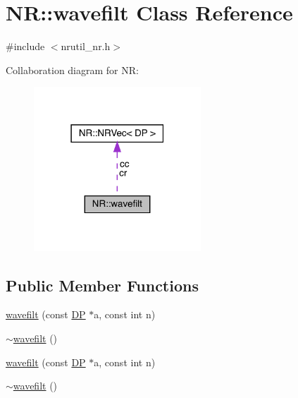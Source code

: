 \hypertarget{classNR_1_1wavefilt}{}\section{NR\+:\+:wavefilt Class Reference}
\label{classNR_1_1wavefilt}


{\ttfamily \#include $<$nrutil\+\_\+nr.\+h$>$}



Collaboration diagram for NR\+:\nopagebreak
\begin{figure}[H]
\begin{center}
\leavevmode
\includegraphics[width=178pt]{d6/d61/classNR_1_1wavefilt__coll__graph}
\end{center}
\end{figure}
\subsection*{Public Member Functions}
\begin{DoxyCompactItemize}
\item 
\mbox{\hyperlink{classNR_1_1wavefilt_aaa684e296af599915cdf4e0963b663c0}{wavefilt}} (const \mbox{\hyperlink{namespaceNR_af6ff762dd605ff477b8e52387253a02a}{DP}} $\ast$a, const int n)
\item 
\mbox{\hyperlink{classNR_1_1wavefilt_a9d223dd0fb637f3f511510b5efd9c6f6}{$\sim$wavefilt}} ()
\item 
\mbox{\hyperlink{classNR_1_1wavefilt_aaa684e296af599915cdf4e0963b663c0}{wavefilt}} (const \mbox{\hyperlink{namespaceNR_af6ff762dd605ff477b8e52387253a02a}{DP}} $\ast$a, const int n)
\item 
\mbox{\hyperlink{classNR_1_1wavefilt_a9d223dd0fb637f3f511510b5efd9c6f6}{$\sim$wavefilt}} ()
\end{DoxyCompactItemize}
